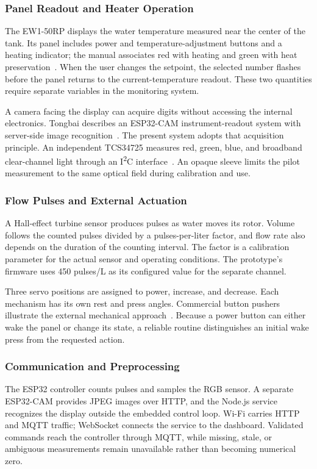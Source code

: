 \subsubsection{Panel Readout and Heater Operation}
The EW1-50RP displays the water temperature measured near the center of the tank. Its panel includes power and temperature-adjustment buttons and a heating indicator; the manual associates red with heating and green with heat preservation~\cite{rheemmanual}. When the user changes the setpoint, the selected number flashes before the panel returns to the current-temperature readout. These two quantities require separate variables in the monitoring system.

A camera facing the display can acquire digits without accessing the internal electronics. Tongbai describes an ESP32-CAM instrument-readout system with server-side image recognition~\cite{tongbai2024}. The present system adopts that acquisition principle. An independent TCS34725 measures red, green, blue, and broadband clear-channel light through an I\textsuperscript{2}C interface~\cite{adafruitcolor}. An opaque sleeve limits the pilot measurement to the same optical field during calibration and use.

\subsubsection{Flow Pulses and External Actuation}
A Hall-effect turbine sensor produces pulses as water moves its rotor. Volume follows the counted pulses divided by a pulses-per-liter factor, and flow rate also depends on the duration of the counting interval. The factor is a calibration parameter for the actual sensor and operating conditions. The prototype's firmware uses 450 pulses/L as its configured value for the separate channel.

Three servo positions are assigned to power, increase, and decrease. Each mechanism has its own rest and press angles. Commercial button pushers illustrate the external mechanical approach~\cite{switchbot}. Because a power button can either wake the panel or change its state, a reliable routine distinguishes an initial wake press from the requested action.

\subsubsection{Communication and Preprocessing}
The ESP32 controller counts pulses and samples the RGB sensor. A separate ESP32-CAM provides JPEG images over HTTP, and the Node.js service recognizes the display outside the embedded control loop. Wi-Fi carries HTTP and MQTT traffic; WebSocket connects the service to the dashboard. Validated commands reach the controller through MQTT, while missing, stale, or ambiguous measurements remain unavailable rather than becoming numerical zero.
